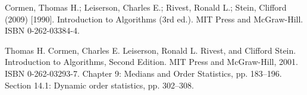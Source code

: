 \documentclass[runningheads, a4paper]{llncs}
\begin{document}
\begin{thebibliography}{4}
    
     Cormen, Thomas H.; Leiserson, Charles E.; Rivest, Ronald L.; Stein, Clifford (2009) [1990]. Introduction to Algorithms (3rd ed.). MIT Press and McGraw-Hill. ISBN 0-262-03384-4.
    
     Thomas H. Cormen, Charles E. Leiserson, Ronald L. Rivest, and Clifford Stein. Introduction to Algorithms, Second Edition. MIT Press and McGraw-Hill, 2001. ISBN 0-262-03293-7. Chapter 9: Medians and Order Statistics, pp. 183–196. Section 14.1: Dynamic order statistics, pp. 302–308.
\end{thebibliography}
        
\end{document}
